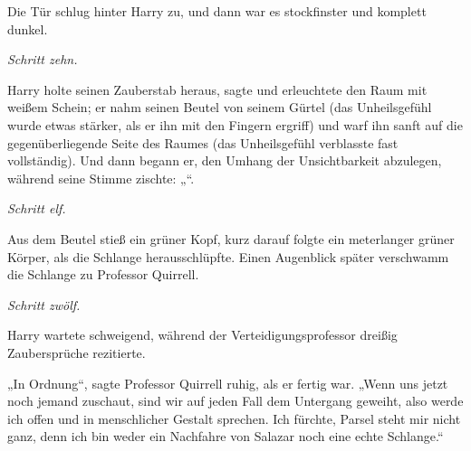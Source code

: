 Die Tür schlug hinter Harry zu, und dann war es stockfinster und komplett dunkel.

\emph{Schritt zehn.}

Harry holte seinen Zauberstab heraus, sagte  und erleuchtete den Raum mit weißem Schein; er nahm seinen Beutel von seinem Gürtel (das Unheilsgefühl wurde etwas stärker, als er ihn mit den Fingern ergriff) und warf ihn sanft auf die gegenüberliegende Seite des Raumes (das Unheilsgefühl verblasste fast vollständig). Und dann begann er, den Umhang der Unsichtbarkeit abzulegen, während seine Stimme zischte: „“.

\emph{Schritt elf.}

Aus dem Beutel stieß ein grüner Kopf, kurz darauf folgte ein meterlanger grüner Körper, als die Schlange herausschlüpfte. Einen Augenblick später verschwamm die Schlange zu Professor Quirrell.

\emph{Schritt zwölf.}

Harry wartete schweigend, während der Verteidigungsprofessor dreißig Zaubersprüche rezitierte.

„In Ordnung“, sagte Professor Quirrell ruhig, als er fertig war.
„Wenn uns jetzt noch jemand zuschaut, sind wir auf jeden Fall dem Untergang geweiht, also werde ich offen und in menschlicher Gestalt sprechen. Ich fürchte, Parsel steht mir nicht ganz, denn ich bin weder ein Nachfahre von Salazar noch eine echte Schlange.“

